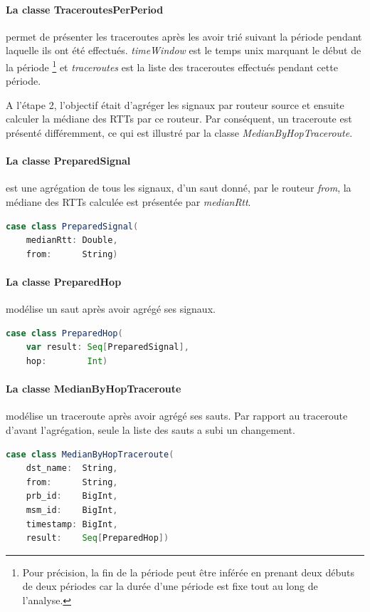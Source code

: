 \paragraph{La classe TraceroutesPerPeriod} permet de présenter les traceroutes après les avoir trié   suivant la période pendant laquelle ils ont été effectués.   \textit{timeWindow} est le temps unix marquant le début de la période \footnote{Pour précision, la fin de la période peut être inférée en prenant deux débuts de deux périodes car la durée d'une période est fixe tout au long de l'analyse.} et  \textit{traceroutes} est la liste des traceroutes effectués pendant cette période. 


A l'étape 2, l'objectif était d'agréger  les signaux par routeur source et ensuite calculer la médiane des RTTs par ce routeur. Par conséquent, un traceroute est présenté différemment, ce qui est  illustré par la classe \textit{MedianByHopTraceroute}.

\paragraph{La classe PreparedSignal }  est une agrégation de tous les signaux, d'un saut donné, par le routeur \textit{from},  la médiane des RTTs calculée est présentée par \textit{medianRtt}.
\begin{lstlisting}[language=scala, caption={La classe PreparedSignal en Scala }]
case class PreparedSignal(
	medianRtt: Double,
	from:      String)
\end{lstlisting}
\paragraph{La classe PreparedHop } modélise un saut après avoir agrégé ses signaux. 
\begin{lstlisting}[language=scala, caption={La classe PreparedHop en Scala }]
case class PreparedHop(
	var result: Seq[PreparedSignal],
	hop:        Int)
\end{lstlisting}


\paragraph{La classe MedianByHopTraceroute } modélise un traceroute après avoir agrégé ses sauts. Par rapport au traceroute d'avant l'agrégation, seule la liste des sauts  a subi un changement. 
\begin{lstlisting}[language=scala, caption={La classe MedianByHopTraceroute en Scala }]
case class MedianByHopTraceroute(
	dst_name:  String,
	from:      String,
	prb_id:    BigInt,
	msm_id:    BigInt,
	timestamp: BigInt,
	result:    Seq[PreparedHop])
\end{lstlisting}


